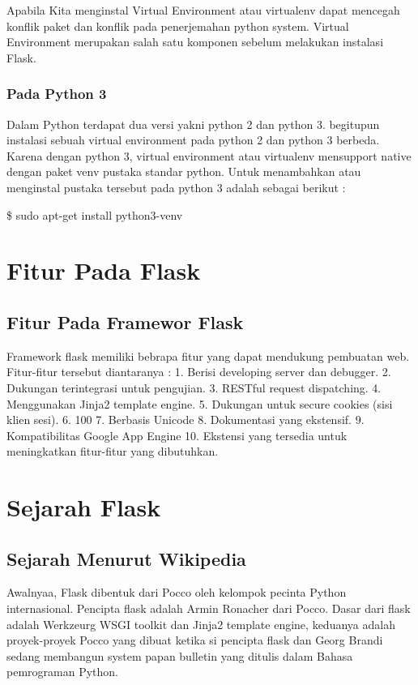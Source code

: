 \documentclass[12pt,a4paper]{article}
\begin{document}
Apabila Kita menginstal Virtual Environment atau virtualenv dapat mencegah konflik paket dan konflik pada penerjemahan python system. Virtual Environment merupakan salah satu komponen sebelum melakukan instalasi Flask.
\subsubsection{Pada Python 3}
Dalam Python terdapat dua versi yakni python 2 dan python 3. begitupun instalasi sebuah virtual environment pada python 2 dan python 3 berbeda. Karena dengan python 3, virtual environment atau virtualenv mensupport native dengan paket venv pustaka standar python. Untuk menambahkan atau menginstal pustaka tersebut pada python 3 adalah sebagai berikut :

\$ sudo apt-get install python3-venv

\section{Fitur Pada Flask}
\subsection{Fitur Pada Framewor Flask}
Framework flask memiliki bebrapa fitur yang dapat mendukung pembuatan web. Fitur-fitur tersebut diantaranya : 
1.	Berisi developing server dan debugger.
2.	Dukungan terintegrasi untuk pengujian.
3.	RESTful request dispatching.
4.	Menggunakan Jinja2 template engine.
5.	Dukungan untuk secure cookies (sisi klien sesi).
6.	100%
7.	Berbasis Unicode
8.	Dokumentasi yang ekstensif.
9.	Kompatibilitas Google App Engine
10.	Ekstensi yang tersedia untuk meningkatkan fitur-fitur yang dibutuhkan.

\section{Sejarah Flask}
\subsection{Sejarah Menurut Wikipedia}
Awalnyaa, Flask dibentuk dari Pocco oleh kelompok pecinta Python internasional. Pencipta flask adalah Armin Ronacher dari Pocco. Dasar dari flask adalah Werkzeurg WSGI toolkit dan Jinja2 template engine, keduanya adalah proyek-proyek Pocco yang dibuat ketika si pencipta flask dan Georg Brandi sedang membangun system papan bulletin yang ditulis dalam Bahasa pemrograman Python.
\end{document}
